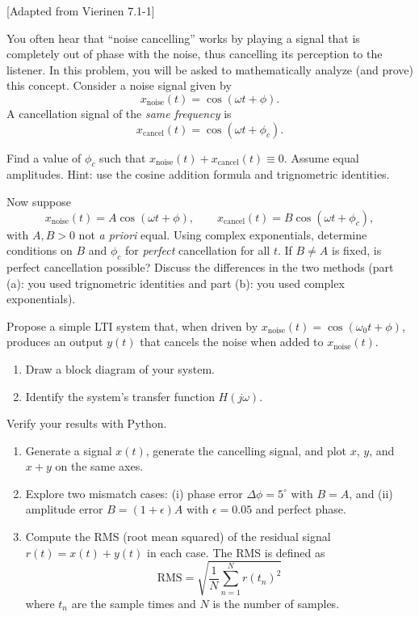 \documentclass{ee102_pset}
\author{\rule{3cm}{0.4pt}} %
\begin{document}
 [Adapted from Vierinen 7.1-1]

You often hear that ``noise cancelling'' works by playing a signal that is completely out of phase with the noise, thus cancelling its perception to the listener. In this problem, you will be asked to mathematically analyze (and prove) this concept. Consider a noise signal given by
\[
x_{\text{noise}}(t)=\cos(\omega t+\phi).
\]
A cancellation signal of the \emph{same frequency} is
\[
x_{\text{cancel}}(t)=\cos(\omega t+\phi_c).
\]

\problempart
Find a value of $\phi_c$ such that $x_{\text{noise}}(t)+x_{\text{cancel}}(t)\equiv 0$. Assume equal amplitudes. Hint: use the cosine addition formula and trignometric identities.

\medskip

\problempart Now suppose
\[
x_{\text{noise}}(t)=A\cos(\omega t+\phi),\qquad
x_{\text{cancel}}(t)=B\cos(\omega t+\phi_c),
\]
with $A,B>0$ not \emph{a priori} equal. Using complex exponentials, determine conditions on $B$ and $\phi_c$ for \emph{perfect} cancellation for all $t$. If $B\neq A$ is fixed, is perfect cancellation possible? Discuss the differences in the two methods (part (a): you used trignometric identities and part (b): you used complex exponentials).



\problempart
Propose a simple LTI system that, when driven by $x_{\text{noise}}(t)=\cos(\omega_0 t+\phi)$, produces an output $y(t)$ that cancels the noise when added to $x_{\text{noise}}(t)$. 
\begin{enumerate}
    \item Draw a block diagram of your system.
    \item Identify the system's transfer function $H(j\omega)$.
\end{enumerate}

\problempart
Verify your results with Python. 
\begin{enumerate}
    \item Generate a signal $x(t)$, generate the cancelling signal, and plot $x$, $y$, and $x+y$ on the same axes.
    \item Explore two mismatch cases: (i) phase error $\Delta\phi=5^\circ$ with $B=A$, and (ii) amplitude error $B=(1+\epsilon)A$ with $\epsilon=0.05$ and perfect phase. 
    \item Compute the RMS (root mean squared) of the residual signal $r(t)=x(t)+y(t)$ in each case. The RMS is defined as
    \[
\text{RMS} = \sqrt{\frac{1}{N}\sum_{n=1}^{N} r(t_n)^2}
\]
where $t_n$ are the sample times and $N$ is the number of samples.
\end{enumerate}
\end{document}
